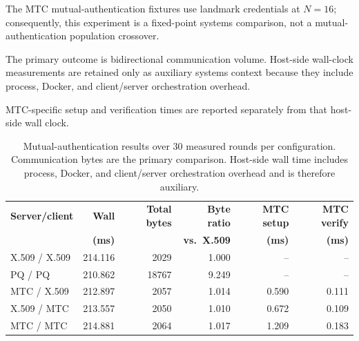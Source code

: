 \documentclass[journal]{IEEEtran}
\begin{document}
The MTC mutual-authentication fixtures use landmark credentials at $N=16$; consequently, this experiment is a fixed-point systems comparison, not a mutual-authentication population crossover.

The primary outcome is bidirectional communication volume.
Host-side wall-clock measurements are retained only as auxiliary systems context because they include process, Docker, and client/server orchestration overhead.

MTC-specific setup and verification times are reported separately from that host-side wall clock.



\begin{table}[t]

\caption{Mutual-authentication results over 30 measured rounds per configuration. Communication bytes are the primary comparison. Host-side wall time includes process, Docker, and client/server orchestration overhead and is therefore auxiliary.}

\label{tab:mutual-auth}

\centering

\begin{tabular}{lrrrrr}

\toprule

\textbf{Server/client} &

\textbf{Wall} &

\textbf{Total bytes} &

\textbf{Byte ratio} &

\textbf{MTC setup} &

\textbf{MTC verify} \\

&

\textbf{(ms)} &

&

\textbf{vs.\ X.509} &

\textbf{(ms)} &

\textbf{(ms)} \\

\midrule

X.509 / X.509 & 214.116 & 2029  & 1.000 & --    & --    \\

PQ / PQ       & 210.862 & 18767 & 9.249 & --    & --    \\

MTC / X.509   & 212.897 & 2057  & 1.014 & 0.590 & 0.111 \\

X.509 / MTC   & 213.557 & 2050  & 1.010 & 0.672 & 0.109 \\

MTC / MTC     & 214.881 & 2064  & 1.017 & 1.209 & 0.183 \\

\bottomrule

\end{tabular}

\end{table}
\end{document}
